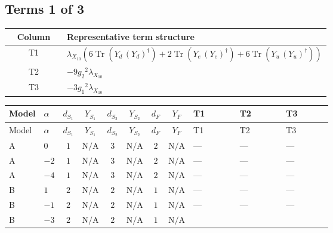 \documentclass[8pt]{article}
\begin{document}
\begin{landscape}
\subsection*{Terms 1 of 3}
\begin{center}
\begin{tabular}{@{}c >{\raggedright\arraybackslash}p{0.82\linewidth}@{}}
\toprule
Column & Representative term structure \\
\midrule
T1 & \(\displaystyle {\lambda_{X_{10}}} (6 \operatorname{Tr}\!\left({Y_d}\,\left({Y_d}\right)^{\dagger}\right)+2 \operatorname{Tr}\!\left({Y_e}\,\left({Y_e}\right)^{\dagger}\right)+6 \operatorname{Tr}\!\left({Y_u}\,\left({Y_u}\right)^{\dagger}\right))\) \\
\midrule
T2 & \(\displaystyle -9 {g_2}^2 {\lambda_{X_{10}}}\) \\
\midrule
T3 & \(\displaystyle -3 {g_1}^2 {\lambda_{X_{10}}}\) \\
\midrule
\bottomrule
\end{tabular}
\end{center}
\smallskip
\tiny
\begin{longtable}{@{}llcccccc >{\raggedright\arraybackslash}p{0.21\linewidth} >{\raggedright\arraybackslash}p{0.21\linewidth} >{\raggedright\arraybackslash}p{0.21\linewidth}@{}}
\toprule
Model & $\alpha$ & $d_{S_1}$ & $Y_{S_1}$ & $d_{S_2}$ & $Y_{S_2}$ & $d_F$ & $Y_F$ & T1 & T2 & T3 \\
\midrule
\endfirsthead
\toprule
Model & $\alpha$ & $d_{S_1}$ & $Y_{S_1}$ & $d_{S_2}$ & $Y_{S_2}$ & $d_F$ & $Y_F$ & T1 & T2 & T3 \\
\midrule
\endhead
A & $0$ & $1$ & $\text{N/A}$ & $3$ & $\text{N/A}$ & $2$ & $\text{N/A}$ & --- & --- & --- \\
\midrule
A & $-2$ & $1$ & $\text{N/A}$ & $3$ & $\text{N/A}$ & $2$ & $\text{N/A}$ & --- & --- & --- \\
\midrule
A & $-4$ & $1$ & $\text{N/A}$ & $3$ & $\text{N/A}$ & $2$ & $\text{N/A}$ & --- & --- & --- \\
\midrule
B & $1$ & $2$ & $\text{N/A}$ & $2$ & $\text{N/A}$ & $1$ & $\text{N/A}$ & --- & --- & --- \\
\midrule
B & $-1$ & $2$ & $\text{N/A}$ & $2$ & $\text{N/A}$ & $1$ & $\text{N/A}$ & --- & --- & --- \\
\midrule
B & $-3$ & $2$ & $\text{N/A}$ & $2$ & $\text{N/A}$ & $1$ & $\text{N/A}$ & \scriptsize\adjustbox{max width=\linewidth}{$\begin{gathered} {\lambda_{X_{10}}} (6 \operatorname{Tr}\!\left({Y_d}\,\left({Y_d}\right)^{\dagger}\right)+2 \operatorname{Tr}\!\left({Y_e}\,\left({Y_e}\right)^{\dagger}\right)+6 \operatorname{Tr}\!\left({Y_u}\,\left({Y_u}\right)^{\dagger}\right))\end{gathered}$} & \scriptsize\adjustbox{max width=\linewidth}{$\begin{gathered} -9 {g_2}^2 {\lambda_{X_{10}}}\end{gathered}$} & \scriptsize\adjustbox{max width=\linewidth}{$\begin{gathered} -3 {g_1}^2 {\lambda_{X_{10}}}\end{gathered}$} \\

\end{longtable}
\end{landscape}
\end{document}

